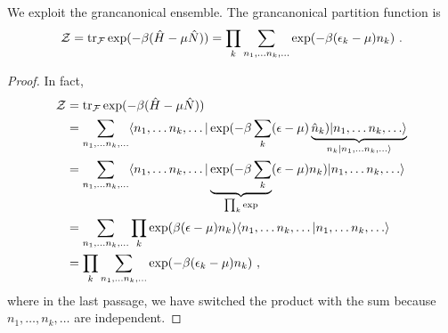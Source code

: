     We exploit the grancanonical ensemble. The grancanonical partition function is 
    \begin{equation*}
        \mathcal Z = \operatorname{tr}_{\mathcal F} \exp(- \beta (\hat H - \mu \hat N)) = \prod_k \sum_{n_1, \ldots n_k, \ldots} \exp(-\beta(\epsilon_k - \mu)n_k) ~.
    \end{equation*}
    \begin{proof}
        In fact, 
        \begin{equation*}
        \begin{aligned}
            \mathcal Z & = \operatorname{tr}_{\mathcal F} \exp(- \beta (\hat H - \mu \hat N)) \\ & = \sum_{n_1, \ldots n_k, \ldots} \langle n_1, \ldots n_k, \ldots\vert \exp(- \beta \sum_k (\epsilon - \mu) \underbrace{\hat n_k) \vert n_1, \ldots n_k, \ldots\rangle}_{n_k \vert n_1, \ldots n_k, \ldots\rangle} \\ & = \sum_{n_1, \ldots n_k, \ldots} \langle n_1, \ldots n_k, \ldots\vert \underbrace{\exp(- \beta \sum_k}_{\prod_k \exp} (\epsilon - \mu) n_k) \vert n_1, \ldots n_k, \ldots\rangle \\ & = \sum_{n_1, \ldots n_k, \ldots} \prod_k \exp(\beta (\epsilon - \mu) n_k) \langle n_1, \ldots n_k, \ldots\vert n_1, \ldots n_k, \ldots\rangle \\ & = \prod_k \sum_{n_1, \ldots n_k, \ldots} \exp(-\beta(\epsilon_k - \mu)n_k) ~,
        \end{aligned}
        \end{equation*}
        where in the last passage, we have switched the product with the sum because $n_1, \ldots, n_k, \ldots$ are independent.
    \end{proof}


